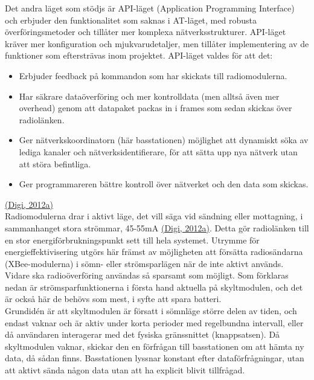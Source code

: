 \documentclass[a4paper,11pt]{article}
\begin{document}
Det andra läget som stödjs är API-läget (Application Programming Interface) och erbjuder den funktionalitet som saknas i AT-läget, med robusta överföringsmetoder och tillåter mer komplexa nätverksstrukturer. API-läget kräver mer konfiguration och mjukvarudetaljer, men tillåter implementering av de funktioner som eftersträvas inom projektet. API-läget valdes för att det:
	
	\begin{itemize}
	\item Erbjuder feedback på kommandon som har skickats till radiomodulerna.
    	\item Har säkrare dataöverföring och mer kontrolldata (men alltså även mer overhead) genom att datapaket packas in i frames som sedan skickas över radiolänken.
    	\item Ger nätverkskoordinatorn (här basstationen) möjlighet att dynamiskt söka av lediga kanaler och nätverksidentifierare, för att sätta upp nya nätverk utan att störa befintliga.
    	\item Ger programmareren bättre kontroll över nätverket och den data som skickas.
    	\end{itemize}
\hyperref[digi]{(Digi, 2012a)}\\
    	
Radiomodulerna drar i aktivt läge, det vill säga vid sändning eller mottagning, i sammanhanget stora strömmar, 45-55mA \hyperref[digi]{(Digi, 2012a)}. Detta gör radiolänken till en stor energiförbrukningspunkt sett till hela systemet. Utrymme för energieffektivisering utgörs här främst av möjligheten att försätta radiosändarna (XBee-modulerna) i sömn- eller strömsparlägen när de inte aktivt används. Vidare ska radioöverföring användas så sparsamt som möjligt. Som förklaras nedan är strömsparfunktionerna i första hand aktuella på skyltmodulen, och det är också här de behövs som mest, i syfte att spara batteri. \\

Grundidén är att skyltmodulen är försatt i sömnläge större delen av tiden, och endast vaknar och är aktiv under korta perioder med regelbundna intervall, eller då användaren interagerar med det fysiska gränssnittet (knappsatsen). Då skyltmodulen vaknar, skickar den en förfrågan till basstationen om att hämta ny data, då sådan finns. Basstationen lyssnar konstant efter dataförfrågningar, utan att aktivt sända någon data utan att ha explicit blivit tillfrågad. \\
\end{document}
